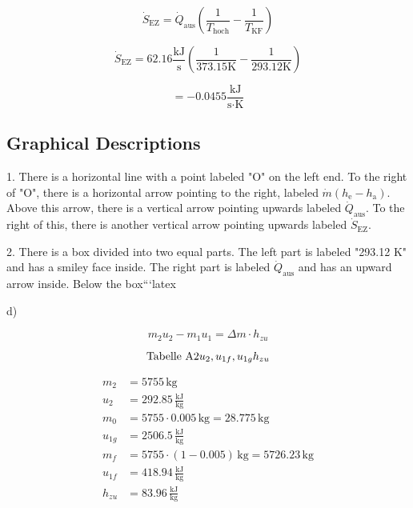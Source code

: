 \[
\dot{S}_{\text{EZ}} = \dot{Q}_{\text{aus}} \left( \frac{1}{T_{\text{hoch}}} - \frac{1}{T_{\text{KF}}} \right)
\]

\[
\dot{S}_{\text{EZ}} = 62.16 \frac{\text{kJ}}{\text{s}} \left( \frac{1}{373.15 \text{K}} - \frac{1}{293.12 \text{K}} \right)
\]

\[
= -0.0455 \frac{\text{kJ}}{\text{s} \cdot \text{K}}
\]

\subsection*{Graphical Descriptions}

1. There is a horizontal line with a point labeled "O" on the left end. To the right of "O", there is a horizontal arrow pointing to the right, labeled $\dot{m} (h_{\text{e}} - h_{\text{a}})$. Above this arrow, there is a vertical arrow pointing upwards labeled $\dot{Q}_{\text{aus}}$. To the right of this, there is another vertical arrow pointing upwards labeled $\dot{S}_{\text{EZ}}$.

2. There is a box divided into two equal parts. The left part is labeled "293.12 K" and has a smiley face inside. The right part is labeled $\dot{Q}_{\text{aus}}$ and has an upward arrow inside. Below the box```latex


d)

\begin{equation*}
m_2 u_2 - m_1 u_1 = \Delta m \cdot h_{zu}
\end{equation*}

\begin{equation*}
\text{Tabelle A2} \\
u_2, u_{1f}, u_{1g} \\
h_{zu}
\end{equation*}

\begin{align*}
m_2 &= 5755 \, \text{kg} \\
u_2 &= 292.85 \, \frac{\text{kJ}}{\text{kg}} \\
m_0 &= 5755 \cdot 0.005 \, \text{kg} = 28.775 \, \text{kg} \\
u_{1g} &= 2506.5 \, \frac{\text{kJ}}{\text{kg}} \\
m_f &= 5755 \cdot (1 - 0.005) \, \text{kg} = 5726.23 \, \text{kg} \\
u_{1f} &= 418.94 \, \frac{\text{kJ}}{\text{kg}} \\
h_{zu} &= 83.96 \, \frac{\text{kJ}}{\text{kg}}
\end{align*}

